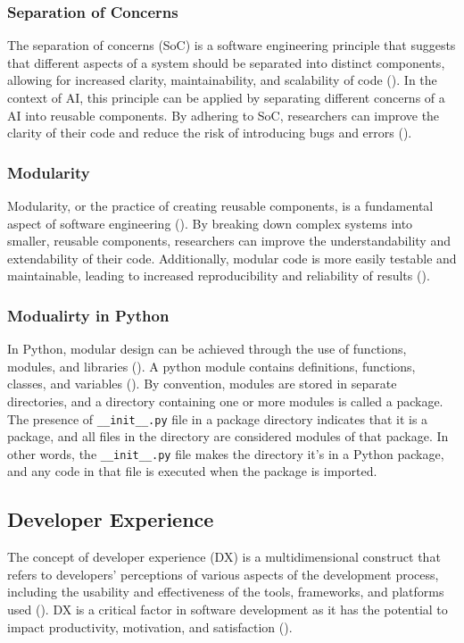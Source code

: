 \subsubsection{Separation of Concerns}
 The separation of concerns (SoC) is a software engineering principle that suggests that different aspects of a system should be separated into distinct components, allowing for increased clarity, maintainability, and scalability of code (\cite{pressman2010software, de2002importance}). 
 In the context of AI, this principle can be applied by separating different concerns of a AI into reusable components. By adhering to SoC, researchers can improve the clarity of their code and reduce the risk of introducing bugs and errors (\cite{mo2016decoupling,mo2016decoupling,pressman2010software, de2002importance}).

\subsubsection{Modularity}
Modularity, or the practice of creating reusable components, is a fundamental aspect of software engineering (\cite{pressman2010software}). By breaking down complex systems into smaller, reusable components, researchers can improve the understandability and extendability of their code. Additionally, modular code is more easily testable and maintainable, leading to increased reproducibility and reliability of results (\cite{amershi2019software,pressman2010software}). 
\subsubsection{Modualirty in Python}
In Python, modular design can be achieved through the use of functions, modules, and libraries (\cite{sanner1999python}). 
A python module contains definitions, functions, classes, and variables (\cite{raschka2015python}). By convention, modules are stored in separate directories, and a directory containing one or more modules is called a package. The presence of \verb|__init__.py| file in a package directory indicates that it is a package, and all files in the directory are considered modules of that package. In other words, the \verb|__init__.py| file makes the directory it's in a Python package, and any code in that file is executed when the package is imported.



\subsection{Developer Experience}
The concept of developer experience (DX) is a multidimensional construct that refers to developers' perceptions of various aspects of the development process, including the usability and effectiveness of the tools, frameworks, and platforms used (\cite{fagerholm2012developer}). DX is a critical factor in software development as it has the potential to impact productivity, motivation, and satisfaction (\cite{fagerholm2012developer}).



